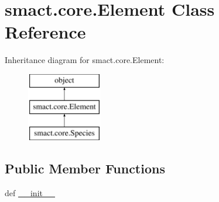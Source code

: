 \hypertarget{classsmact_1_1core_1_1_element}{}\section{smact.\+core.\+Element Class Reference}
\label{classsmact_1_1core_1_1_element}
Inheritance diagram for smact.\+core.\+Element\+:\begin{figure}[H]
\begin{center}
\leavevmode
\includegraphics[height=3.000000cm]{classsmact_1_1core_1_1_element}
\end{center}
\end{figure}
\subsection*{Public Member Functions}
\begin{DoxyCompactItemize}
\item 
def \hyperlink{classsmact_1_1core_1_1_element_a584b465cd6f0c624f5c092f7517d4305}{\+\_\+\+\_\+init\+\_\+\+\_\+}
\end{DoxyCompactItemize}
